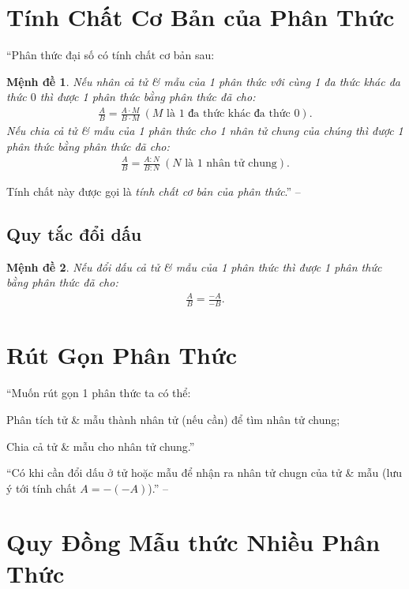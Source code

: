 \documentclass[oneside]{book}
\numberwithin{equation}{section}
\newtheorem{menhde}{Mệnh đề}[section]
\begin{document}
\section{Tính Chất Cơ Bản của Phân Thức}
``Phân thức đại số có tính chất cơ bản sau:

\begin{menhde}
	Nếu nhân cả tử \& mẫu của 1 phân thức với cùng 1 đa thức khác đa thức $0$ thì được 1 phân thức bằng phân thức đã cho:
	\begin{align*}
		\frac{A}{B} = \frac{A\cdot M}{B\cdot M}\ (M\mbox{ là 1 đa thức khác đa thức } 0).
	\end{align*}
	Nếu chia cả tử \& mẫu của 1 phân thức cho 1 nhân tử chung của chúng thì được 1 phân thức bằng phân thức đã cho:
	\begin{align*}
		\frac{A}{B} = \frac{A:N}{B:N}\ (N\mbox{ là 1 nhân tử chung}).
	\end{align*}
\end{menhde}
Tính chất này được gọi là \textit{tính chất cơ bản của phân thức}.'' -- \cite[p. 37]{SGK_Toan_8_tap_1}

\subsection{Quy tắc đổi dấu}

\begin{menhde}
	Nếu đổi dấu cả tử \& mẫu của 1 phân thức thì được 1 phân thức bằng phân thức đã cho:
	\begin{align*}
		\frac{A}{B} = \frac{-A}{-B}.
	\end{align*}
\end{menhde}

\section{Rút Gọn Phân Thức}
``Muốn rút gọn 1 phân thức ta có thể:
\begin{enumerate*}
	\item Phân tích tử \& mẫu thành nhân tử (nếu cần) để tìm nhân tử chung;
	\item Chia cả tử \& mẫu cho nhân tử chung.''
\end{enumerate*}
``Có khi cần đổi dấu ở tử hoặc mẫu để nhận ra nhân tử chugn của tử \& mẫu (lưu ý tới tính chất $A = -(-A)$).'' -- \cite[p. 39]{SGK_Toan_8_tap_1}

\section{Quy Đồng Mẫu thức Nhiều Phân Thức}
\end{document}
